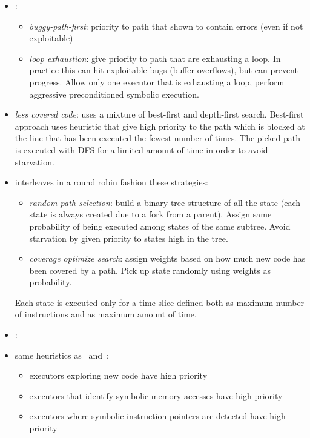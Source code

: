 \begin{itemize}

  \item \cite{AEG-NDSS11}:
  \begin{itemize}
    \item {\em buggy-path-first}: priority to path that shown to contain errors (even if not exploitable)
    \item {\em loop exhaustion}: give priority to path that are exhausting a loop. In practice this can hit exploitable bugs (buffer overflows), but can prevent progress. Allow only one executor that is exhausting a loop, perform aggressive preconditioned symbolic execution.
  \end{itemize}

  \item {\em less covered code}: \cite{EXE-CCS06} uses a mixture of best-first and depth-first search. Best-first approach uses heuristic that give high priority to the path which is blocked at the line that has been executed the fewest number of times. The picked path is executed with DFS for a limited amount of time in order to avoid starvation. 

  \item \cite{KLEE-OSDI08} interleaves in a round robin fashion these strategies:
  \begin{itemize}
    \item {\em random path selection}: build a binary tree structure of all the state (each state is always created due to a fork from a parent). Assign same probability of being executed among states of the same subtree. Avoid starvation by given priority to states high in the tree.
    \item {\em coverage optimize search}: assign weights based on how much new code has been covered by a path. Pick up state randomly using weights as probability.
  \end{itemize}
  Each state is executed only for a time slice defined both as maximum number of instructions and as maximum amount of time.

  \item \cite{SAGE-NDSS08}:

  \item \cite{MAYHEM-SP12} same heuristics as~\cite{SAGE-NDSS08} and~\cite{KLEE-OSDI08}:
  \begin{itemize}
    \item executors exploring new code have high priority
    \item executors that identify symbolic memory accesses have high priority
    \item executors where symbolic instruction pointers are detected have high priority
  \end{itemize}


\end{itemize}
